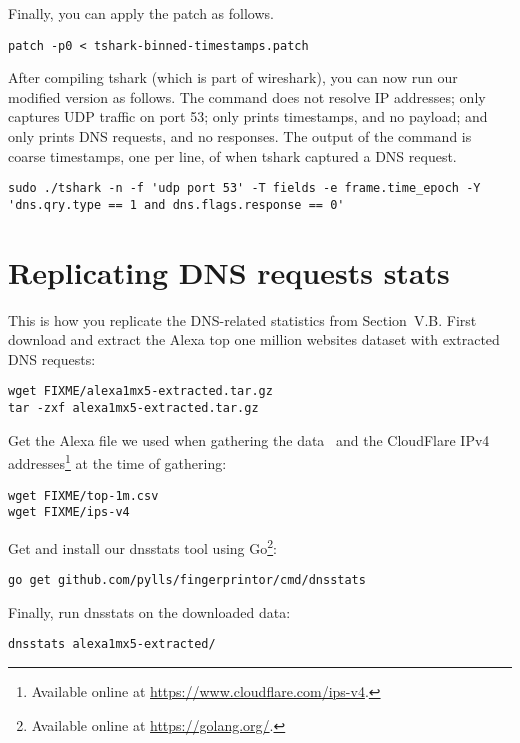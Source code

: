 \documentclass{article}
\begin{document}
Finally, you can apply the patch as follows.

\begin{lstlisting}
patch -p0 < tshark-binned-timestamps.patch
\end{lstlisting}

After compiling tshark (which is part of wireshark), you can now run our
modified version as follows.  The command does not resolve IP addresses; only
captures UDP traffic on port 53; only prints timestamps, and no payload; and
only prints DNS requests, and no responses.  The output of the command is coarse
timestamps, one per line, of when tshark captured a DNS request.

\begin{lstlisting}
sudo ./tshark -n -f 'udp port 53' -T fields -e frame.time_epoch -Y 'dns.qry.type == 1 and dns.flags.response == 0'
\end{lstlisting}

\section{Replicating DNS requests stats}
This is how you replicate the DNS-related statistics from Section~V.B.  First
download and extract the Alexa top one million websites dataset with extracted
DNS requests:

\begin{lstlisting}
wget FIXME/alexa1mx5-extracted.tar.gz
tar -zxf alexa1mx5-extracted.tar.gz
\end{lstlisting}

Get the Alexa file we used when gathering the data~\cite{alexatop1k} and the
CloudFlare IPv4 addresses\footnote{Available online at
\url{https://www.cloudflare.com/ips-v4}.} at the time of gathering:

\begin{lstlisting}
wget FIXME/top-1m.csv
wget FIXME/ips-v4
\end{lstlisting}

Get and install our dnsstats tool using Go\footnote{Available online at
\url{https://golang.org/}.}:

\begin{lstlisting}
go get github.com/pylls/fingerprintor/cmd/dnsstats
\end{lstlisting}

Finally, run dnsstats on the downloaded data:

\begin{lstlisting}
dnsstats alexa1mx5-extracted/
\end{lstlisting}
\end{document}

